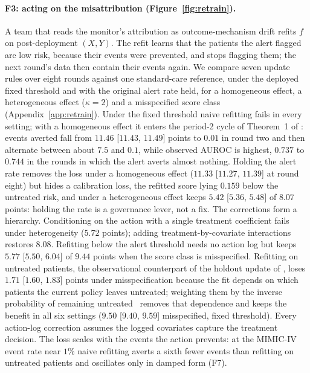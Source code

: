 \documentclass[letterpaper]{article} %
\begin{document}
\paragraph{F3: acting on the misattribution (Figure~\ref{fig:retrain}).}
A team that reads the monitor's attribution as outcome-mechanism drift refits
$f$ on post-deployment $(X, Y)$. The refit learns that the patients the alert
flagged are low risk, because their events were prevented, and stops flagging
them; the next round's data then contain their events again. We compare seven update rules over eight rounds against one
standard-care reference, under the deployed fixed threshold and with the
original alert rate held, for a homogeneous effect, a heterogeneous effect
($\kappa = 2$) and a misspecified score class (Appendix~\ref{app:retrain}).
Under the fixed threshold naive refitting fails in every setting; with a
homogeneous effect it enters the period-2 cycle of Theorem~1 of
\citet{liley2021model}: events averted fall from $11.46$ [$11.43$, $11.49$]
points to $0.01$ in round two and then alternate between about $7.5$ and
$0.1$, while observed AUROC is highest, $0.737$ to $0.744$ in the rounds in which
the alert averts almost nothing. Holding the alert rate removes the
loss under a homogeneous effect ($11.33$ [$11.27$, $11.39$] at round eight)
but hides a calibration loss, the refitted score lying $0.159$ below the
untreated risk, and under a heterogeneous effect keeps $5.42$ [$5.36$,
$5.48$] of $8.07$ points: holding the rate is a governance lever, not a fix.
The corrections form a hierarchy. Conditioning on the action with a single
treatment coefficient fails under heterogeneity ($5.72$ points); adding
treatment-by-covariate interactions restores $8.08$. Refitting below the
alert threshold needs no action log but keeps $5.77$ [$5.50$, $6.04$] of
$9.44$ points when the score class is misspecified. Refitting on untreated
patients, the observational counterpart of the holdout update of
\citet{liley2021model}, loses $1.71$ [$1.60$, $1.83$] points under
misspecification because the fit depends on which patients the current policy
leaves untreated; weighting them by the inverse probability of remaining
untreated~\citep{sperrin2018msm} removes that dependence and keeps the benefit
in all six settings ($9.50$ [$9.40$, $9.59$] misspecified, fixed threshold).
Every action-log correction assumes the logged covariates capture the
treatment decision. The loss scales with the events the action prevents: at
the MIMIC-IV event rate near $1\%$ naive refitting averts a sixth fewer
events than refitting on untreated patients and oscillates only in damped
form (F7).
\end{document}
